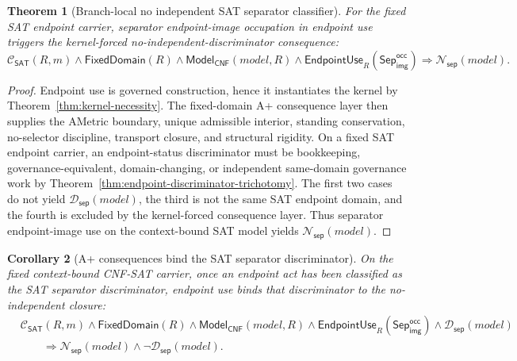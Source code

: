 \documentclass[11pt]{article}
\newtheorem{theorem}{Theorem}[section]
\newtheorem{corollary}[theorem]{Corollary}
\theoremstyle{definition}
\theoremstyle{remark}
\newcommand{\SepImgOcc}{\mathsf{Sep}_{\mathsf{img}}^{\mathsf{occ}}}
\newcommand{\ClayCtx}{\mathcal{C}_{\mathsf{SAT}}(R,m)}
\newcommand{\EndpointUse}{\mathsf{EndpointUse}}
\newcommand{\FixedDom}{\mathsf{FixedDomain}}
\newcommand{\SepDisc}{\mathcal{D}_{\mathsf{sep}}}
\newcommand{\NoSepDisc}{\mathcal{N}_{\mathsf{sep}}}
\newcommand{\ModelOfCnf}{\mathsf{Model}_{\mathsf{CNF}}}
\begin{document}
\begin{theorem}[Branch-local no independent SAT separator classifier]\label{thm:no-independent-sat-separator-classifier}
For the fixed SAT endpoint carrier, separator endpoint-image occupation in endpoint use triggers the kernel-forced no-independent-discriminator consequence:
\[
  \ClayCtx\wedge\FixedDom(R)\wedge\ModelOfCnf(model,R)\wedge\EndpointUse_R(\SepImgOcc)
  \Rightarrow
  \NoSepDisc(model).
\]
\end{theorem}

\begin{proof}
Endpoint use is governed construction, hence it instantiates the kernel by Theorem~\ref{thm:kernel-necessity}. The fixed-domain A+ consequence layer then supplies the AMetric boundary, unique admissible interior, standing conservation, no-selector discipline, transport closure, and structural rigidity. On a fixed SAT endpoint carrier, an endpoint-status discriminator must be bookkeeping, governance-equivalent, domain-changing, or independent same-domain governance work by Theorem~\ref{thm:endpoint-discriminator-trichotomy}. The first two cases do not yield \(\SepDisc(model)\), the third is not the same SAT endpoint domain, and the fourth is excluded by the kernel-forced consequence layer. Thus separator endpoint-image use on the context-bound SAT model yields \(\NoSepDisc(model)\).
\end{proof}



\begin{corollary}[A+ consequences bind the SAT separator discriminator]
\label{cor:aplus-binds-sat-separator-discriminator}
On the fixed context-bound CNF-SAT carrier, once an endpoint act has been classified as the SAT separator discriminator, endpoint use binds that discriminator to the no-independent closure:
\[
\begin{aligned}
  &\ClayCtx\wedge\FixedDom(R)\wedge\ModelOfCnf(model,R)\wedge\EndpointUse_R(\SepImgOcc)\wedge\SepDisc(model)\\
  &\qquad\Rightarrow \NoSepDisc(model)\wedge\neg\SepDisc(model).
\end{aligned}
\]
\end{corollary}
\end{document}
